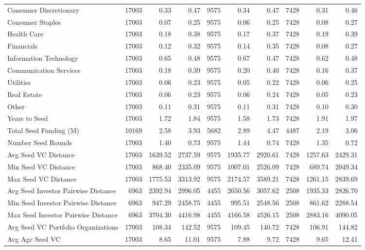 {\begin{table}[!h]
{\begin{tabular}[t]{lrrrrrrrrr}
Consumer Discretionary & 17003 & 0.33 & 0.47 & 9575 & 0.34 & 0.47 & 7428 & 0.31 & 0.46\\
Consumer Staples & 17003 & 0.07 & 0.25 & 9575 & 0.06 & 0.25 & 7428 & 0.08 & 0.27\\
Health Care & 17003 & 0.18 & 0.38 & 9575 & 0.17 & 0.37 & 7428 & 0.19 & 0.39\\
Financials & 17003 & 0.12 & 0.32 & 9575 & 0.14 & 0.35 & 7428 & 0.08 & 0.27\\
\addlinespace
Information Technology & 17003 & 0.65 & 0.48 & 9575 & 0.67 & 0.47 & 7428 & 0.62 & 0.48\\
Communication Services & 17003 & 0.18 & 0.39 & 9575 & 0.20 & 0.40 & 7428 & 0.16 & 0.37\\
Utilities & 17003 & 0.06 & 0.23 & 9575 & 0.05 & 0.22 & 7428 & 0.06 & 0.25\\
Real Estate & 17003 & 0.06 & 0.23 & 9575 & 0.06 & 0.24 & 7428 & 0.05 & 0.23\\
Other & 17003 & 0.11 & 0.31 & 9575 & 0.11 & 0.31 & 7428 & 0.10 & 0.30\\
\addlinespace
Years to Seed & 17003 & 1.72 & 1.84 & 9575 & 1.58 & 1.73 & 7428 & 1.91 & 1.97\\
Total Seed Funding (M) & 10169 & 2.58 & 3.93 & 5682 & 2.89 & 4.47 & 4487 & 2.19 & 3.06\\
Number Seed Rounds & 17003 & 1.40 & 0.73 & 9575 & 1.44 & 0.74 & 7428 & 1.35 & 0.72\\
Avg Seed VC Distance & 17003 & 1639.52 & 2737.59 & 9575 & 1935.77 & 2920.61 & 7428 & 1257.63 & 2429.31\\
Min Seed VC Distance & 17003 & 868.40 & 2335.09 & 9575 & 1007.01 & 2526.09 & 7428 & 689.74 & 2049.34\\
\addlinespace
Max Seed VC Distance & 17003 & 1775.53 & 3313.92 & 9575 & 2174.57 & 3589.21 & 7428 & 1261.15 & 2839.69\\
Avg Seed Investor Pairwise Distance & 6963 & 2392.94 & 2996.05 & 4455 & 2650.56 & 3057.62 & 2508 & 1935.33 & 2826.70\\
Min Seed Investor Pairwise Distance & 6963 & 947.29 & 2458.75 & 4455 & 995.51 & 2548.56 & 2508 & 861.62 & 2288.54\\
Max Seed Investor Pairwise Distance & 6963 & 3704.30 & 4416.98 & 4455 & 4166.58 & 4526.15 & 2508 & 2883.16 & 4090.05\\
Avg Seed VC Portfolio Organizations & 17003 & 108.34 & 142.52 & 9575 & 109.45 & 140.72 & 7428 & 106.91 & 144.82\\
\addlinespace
Avg Age Seed VC & 17003 & 8.65 & 11.01 & 9575 & 7.88 & 9.72 & 7428 & 9.65 & 12.41\\

\end{tabular}}
\end{table}}
